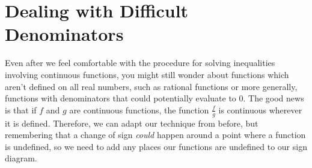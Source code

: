 \documentclass[noauthor, nooutcomes]{ximera}
\begin{document}
\section{Dealing with Difficult Denominators}
Even after we feel comfortable with the procedure for solving inequalities involving continuous functions, you might still wonder about functions which aren't defined on all real numbers, such as rational functions or more generally, functions with denominators that could potentially evaluate to 0. The good news is that if $f$ and $g$ are continuous functions, the function $\frac{f}{g}$ is continuous wherever it is defined. Therefore, we can adapt our technique from before, but remembering that a change of sign \emph{could} happen around a point where a function is undefined, so we need to add any places our functions are undefined to our sign diagram.
\end{document}
